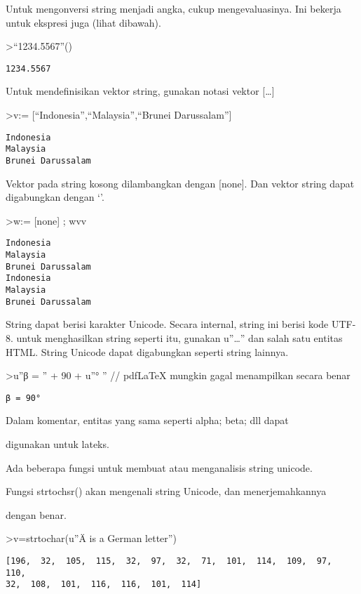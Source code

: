 \documentclass[
]{book}
\begin{document}
Untuk mengonversi string menjadi angka, cukup mengevaluasinya. Ini bekerja untuk ekspresi juga (lihat dibawah).

\textgreater{}``1234.5567''()

\begin{verbatim}
1234.5567
\end{verbatim}

Untuk mendefinisikan vektor string, gunakan notasi vektor {[}\ldots{]}

\textgreater v:= {[}``Indonesia'',``Malaysia'',``Brunei Darussalam''{]}

\begin{verbatim}
Indonesia
Malaysia
Brunei Darussalam
\end{verbatim}

Vektor pada string kosong dilambangkan dengan {[}none{]}. Dan vektor string dapat digabungkan dengan `\textbar{}'.

\textgreater w:= {[}none{]} ; w\textbar v\textbar v

\begin{verbatim}
Indonesia
Malaysia
Brunei Darussalam
Indonesia
Malaysia
Brunei Darussalam
\end{verbatim}

String dapat berisi karakter Unicode. Secara internal, string ini berisi kode UTF-8. untuk menghasilkan string seperti itu, gunakan u''\ldots'' dan salah satu entitas HTML. String Unicode dapat digabungkan seperti string lainnya.

\textgreater u''β = '' + 90 + u''° '' // pdfLaTeX mungkin gagal menampilkan secara benar

\begin{verbatim}
β = 90° 
\end{verbatim}

Dalam komentar, entitas yang sama seperti alpha; beta; dll dapat

digunakan untuk lateks.

Ada beberapa fungsi untuk membuat atau menganalisis string unicode.

Fungsi strtochsr() akan mengenali string Unicode, dan menerjemahkannya

dengan benar.

\textgreater v=strtochar(u''Ä is a German letter'')

\begin{verbatim}
[196,  32,  105,  115,  32,  97,  32,  71,  101,  114,  109,  97,  110,
32,  108,  101,  116,  116,  101,  114]
\end{verbatim}
\end{document}
